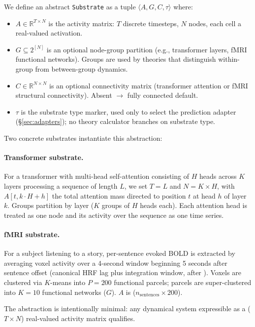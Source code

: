 \documentclass[11pt,a4paper]{article}
\begin{document}
We define an abstract \texttt{Substrate} as a tuple $\langle A, G, C, \tau \rangle$ where:

\begin{itemize}
  \item $A \in \mathbb{R}^{T \times N}$ is the activity matrix: $T$ discrete timesteps, $N$ nodes, each cell a real-valued activation.
  \item $G \subseteq 2^{[N]}$ is an optional node-group partition (e.g., transformer layers, fMRI functional networks). Groups are used by theories that distinguish within-group from between-group dynamics.
  \item $C \in \mathbb{R}^{N \times N}$ is an optional connectivity matrix (transformer attention or fMRI structural connectivity). Absent $\rightarrow$ fully connected default.
  \item $\tau$ is the substrate type marker, used only to select the prediction adapter (\S\ref{sec:adapters}); no theory calculator branches on substrate type.
\end{itemize}

Two concrete substrates instantiate this abstraction:

\paragraph{Transformer substrate.} For a transformer with multi-head self-attention \citep{vaswani2017attention} consisting of $H$ heads across $K$ layers processing a sequence of length $L$, we set $T = L$ and $N = K \times H$, with $A[t, k \cdot H + h]$ the total attention mass directed to position $t$ at head $h$ of layer $k$. Groups partition by layer ($K$ groups of $H$ heads each). Each attention head is treated as one node and its activity over the sequence as one time series.

\paragraph{fMRI substrate.} For a subject listening to a story, per-sentence evoked BOLD is extracted by averaging voxel activity over a 4-second window beginning 5 seconds after sentence offset (canonical HRF lag plus integration window, after \citealt{boynton1996linear}). Voxels are clustered via $K$-means into $P = 200$ functional parcels; parcels are super-clustered into $K = 10$ functional networks ($G$). $A$ is ($n_{\mathrm{sentences}} \times 200$).

The abstraction is intentionally minimal: any dynamical system expressible as a ($T \times N$) real-valued activity matrix qualifies.
\end{document}
